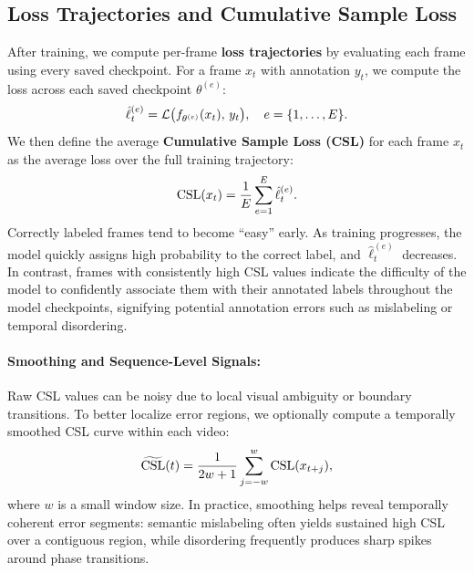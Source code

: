 \documentclass{article}
\theoremstyle{plain}
\theoremstyle{definition}
\theoremstyle{remark}
\begin{document}
\vspace{-0.4em}
\subsection{Loss Trajectories and Cumulative Sample Loss}
\label{subsec:csl}
After training, we compute per-frame \textbf{loss trajectories} by evaluating each frame using every saved checkpoint. For a frame $x_t$ with annotation $y_t$, we compute the loss across each saved checkpoint $\theta^{(e)}$:
\vspace{-0.4em}
\begin{equation}
\hat{\ell}^{(e)}_t = \mathcal{L}\big(f_{\theta^{(e)}}(x_t),\, y_t\big), \quad e=\{1,\dots,E\}.
\vspace{-0.4em}
\end{equation}
We then define the average \textbf{Cumulative Sample Loss (CSL)} for each frame $x_t$ as the average loss over the full training trajectory:
\vspace{-0.4em}
\begin{equation}
\mathrm{CSL}(x_t) = \frac{1}{E}\sum_{e=1}^{E}\hat{\ell}^{(e)}_t.
\vspace{-0.4em}
\end{equation}
Correctly labeled frames tend to become ``easy'' early. As training progresses, the model quickly assigns high probability to the correct label, and $\hat{\ell}^{(e)}_t$ decreases. In contrast, frames with consistently high CSL values indicate the difficulty of the model to confidently associate them with their annotated labels throughout the model checkpoints, signifying potential annotation errors such as mislabeling or temporal disordering.

\paragraph{Smoothing and Sequence-Level Signals:}
Raw CSL values can be noisy due to local visual ambiguity or boundary transitions. To better localize error regions, we optionally compute a temporally smoothed CSL curve within each video:
\vspace{-0.4em}
\begin{equation}
\widetilde{\mathrm{CSL}}(t) = \frac{1}{2w+1}\sum_{j=-w}^{w} \mathrm{CSL}(x_{t+j}),
\vspace{-0.4em}
\end{equation}
where $w$ is a small window size. In practice, smoothing helps reveal temporally coherent error segments: semantic mislabeling often yields sustained high CSL over a contiguous region, while disordering frequently produces sharp spikes around phase transitions.
\end{document}

